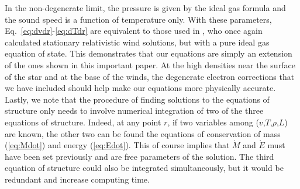 \documentclass[../main.tex]{subfiles}
\newcommand{\Mdot}{\dot{M}}
\newcommand{\Edot}{\dot{E}}
\begin{document}
In the non-degenerate limit, the pressure is given by the ideal gas formula and the sound speed is a function of temperature only. With these parameters, Eq.~\eqref{eq:dvdr}-\eqref{eq:dTdr} are equivalent to those used in \citet{Paczynski1986b}, who once again calculated stationary relativistic wind solutions, but with a pure ideal gas equation of state. This demonstrates that our equations are simply an extension of the ones shown in this important paper. At the high densities near the surface of the star and at the base of the winds, the degenerate electron corrections that we have included should help make our equations more physically accurate.\\

Lastly, we note that the procedure of finding solutions to the equations of structure only needs to involve numerical integration of two of the three equations of structure. Indeed, at any point $r$, if two variables among ($v$,$T$,$\rho$,$L$) are known, the other two can be found the equations of conservation of mass (\ref{eq:Mdot}) and energy (\ref{eq:Edot}). This of course implies that $\Mdot$ and $\Edot$ must have been set previously and are free parameters of the solution. The third equation of structure could also be integrated simultaneously, but it would be redundant and increase computing time.


\biblio
\end{document}
